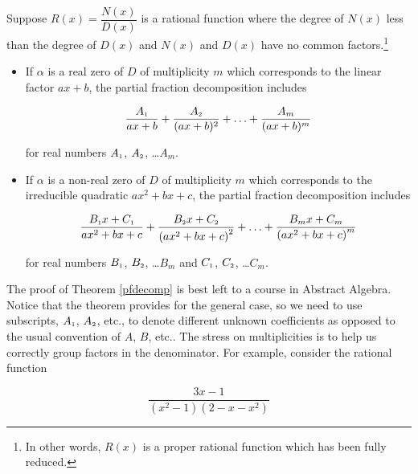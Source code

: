 \colorbox{ResultColor}{\bbm

\begin{thm}  \label{pfdecomp} Suppose $R(x) = \dfrac{N(x)}{D(x)}$ is a rational function where the degree of $N(x)$ less than the degree of $D(x)$ and $N(x)$ and $D(x)$ have no common factors.\footnote{In other words, $R(x)$ is a proper rational function which has been fully reduced.}

\begin{itemize}

\item  If $\alpha$ is a real zero of $D$ of multiplicity $m$ which corresponds to the linear factor $ax+b$, the partial fraction decomposition includes

\[ \dfrac{A_{\mbox{\tiny$1$}}}{ax+b} + \dfrac{A_{\mbox{\tiny$2$}}}{(ax+b)^2} + \ldots + \dfrac{A_{m}}{(ax+b)^m} \]

for real numbers $A_{\mbox{\tiny$1$}}$, $A_{\mbox{\tiny$2$}}$, \ldots $A_{m}$.

\item  If $\alpha$ is a non-real zero of $D$ of multiplicity $m$ which corresponds to the irreducible quadratic $ax^2+bx+c$, the partial fraction decomposition includes  

\[ \dfrac{B_{\mbox{\tiny$1$}}x + C_{\mbox{\tiny$1$}}}{ax^2+bx+c} + \dfrac{B_{\mbox{\tiny$2$}}x + C_{\mbox{\tiny$2$}}}{\left(ax^2+bx+c\right)^2} + \ldots +\dfrac{B_{m}x + C_{m}}{\left(ax^2+bx+c\right)^m} \]

for real numbers $B_{\mbox{\tiny$1$}}$, $B_{\mbox{\tiny$2$}}$, \ldots $B_{m}$ and $C_{\mbox{\tiny$1$}}$, $C_{\mbox{\tiny$2$}}$, \ldots $C_{m}$. 

\end{itemize}


\end{thm}

\ebm}


\smallskip

The proof of Theorem \ref{pfdecomp} is best left to a course in Abstract Algebra.  Notice that the theorem provides for the general case, so we need to use subscripts, $A_{\mbox{\tiny$1$}}$, $A_{\mbox{\tiny$2$}}$, etc.,  to denote different unknown coefficients as opposed to the usual convention of $A$, $B$, etc..  The stress on multiplicities is to help us correctly group factors in the denominator.  For example, consider the rational function

\[\dfrac{3x-1}{\left(x^2-1\right)\left(2-x-x^2\right)}\]

